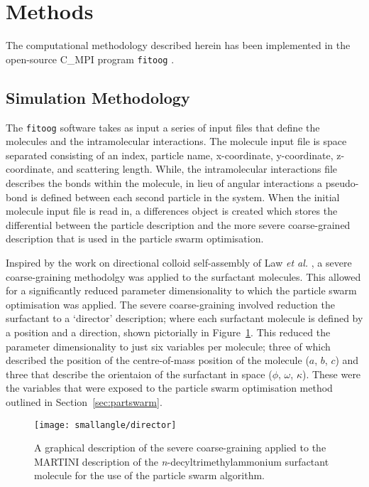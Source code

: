 \section{Methods}

The computational methodology described herein has been implemented in the open-source C\_MPI program \texttt{fitoog} \cite{mccluskey_arm61/fitoog_2019}.

\subsection{Simulation Methodology}

The \texttt{fitoog} software takes as input a series of input files that define the molecules and the intramolecular interactions. 
The molecule input file is space separated consisting of an index, particle name, x-coordinate, y-coordinate, z-coordinate, and scattering length. 
While, the intramolecular interactions file describes the bonds within the molecule, in lieu of angular interactions a pseudo-bond is defined between each second particle in the system. 
When the initial molecule input file is read in, a differences object is created which stores the differential between the particle description and the more severe coarse-grained description that is used in the particle swarm optimisation. 

Inspired by the work on directional colloid self-assembly of Law \emph{et al.} \cite{}, a severe coarse-graining methodolgy was applied to the surfactant molecules.
This allowed for a significantly reduced parameter dimensionality to which the particle swarm optimisation was applied. 
The severe coarse-graining involved reduction the surfactant to a `director' description; where each surfactant molecule is defined by a position and a direction, shown pictorially in Figure~\ref{fig:director}.
This reduced the parameter dimensionality to just six variables per molecule; three of which described the position of the centre-of-mass position of the molecule ($a$, $b$, $c$) and three that describe the orientaion of the surfactant in space ($\phi$, $\omega$, $\kappa$).
These were the variables that were exposed to the particle swarm optimisation method outlined in Section~\ref{sec:partswarm}.
%
\begin{figure}
    \centering
    \texttt{[image: smallangle/director]}
    \caption{A graphical description of the severe coarse-graining applied to the MARTINI description of the \emph{n}-decyltrimethylammonium surfactant molecule for the use of the particle swarm algorithm.}
    \label{fig:director}
\end{figure}
%

